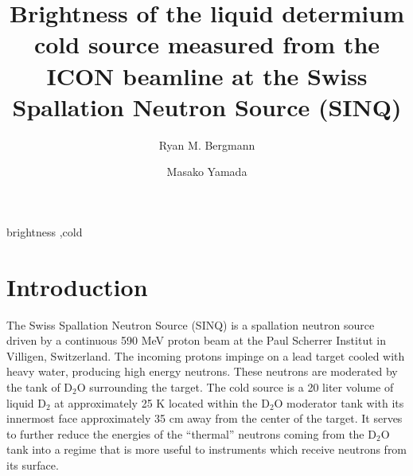 \documentclass[preprint,12pt]{elsarticle}
\begin{document}
\begin{frontmatter}



\title{Brightness of the liquid determium cold source measured from the ICON beamline at the Swiss Spallation Neutron Source (SINQ)}


\author{Ryan M. Bergmann}

\author{Masako Yamada}



\address{Paul Scherrer Institut, Villigen, Switzerland}

\begin{abstract}


\end{abstract}

\begin{keyword}
brightness \sep cold


\end{keyword}


\end{frontmatter}

\linenumbers


\section{Introduction}
\label{sec:intro}

The Swiss Spallation Neutron Source (SINQ) is a spallation neutron source driven by a continuous 590 MeV proton beam at the Paul Scherrer Institut in Villigen, Switzerland.  The incoming protons impinge on a lead target cooled with heavy water, producing high energy neutrons.  These neutrons are moderated by the tank of D$_2$O surrounding the target.  The cold source is a 20 liter volume of liquid D$_2$ at approximately 25 K located within the D$_2$O moderator tank with its innermost face approximately 35 cm away from the center of the target.  It serves to further reduce the energies of the ``thermal'' neutrons coming from the D$_2$O tank into a regime that is more useful to instruments which receive neutrons from its surface.  
\end{document}
